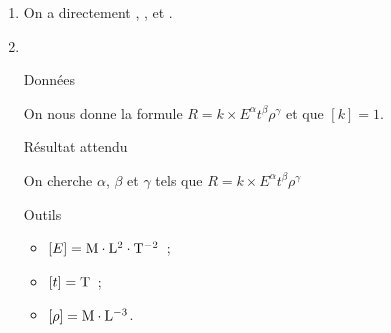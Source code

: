 \documentclass[../main/main.tex]{subfiles}
\begin{document}
\begin{enumerate}
	\item On a directement , ,
	       et .
	\item ~
	      \begin{tcbraster}[raster columns=2, raster equal height=rows]
		      \begin{tcolorbox}[blankest, raster multicolumn=1, space to=\myspace]
			      \begin{tcbraster}[raster columns=1]
				      \begin{NCdefi}[]{Données}

					      On nous donne la formule $R = k\times
						      E^{\alpha}t^\beta\rho^\gamma$ et que $[k] = 1$.

				      \end{NCdefi}
				      \begin{NCprop}[]{Résultat attendu}

					      On cherche $\alpha$, $\beta$ et $\gamma$ tels que $R =
						      k\times E^{\alpha}t^\beta\rho^\gamma$

				      \end{NCprop}
				      \begin{NCrapp}[add to natural height=\myspace]{Outils}

					      \begin{itemize}
						      \item $[E] = \rm M\cdot L^2\cdot T^{-2}$~;
						      \item $[t] = \rm T$~;
						      \item $[\rho] = \rm M\cdot L^{-3}$.
					      \end{itemize}


\end{NCrapp}
\end{tcbraster}
\end{tcolorbox}
\end{tcbraster}
\end{enumerate}
\end{document}
